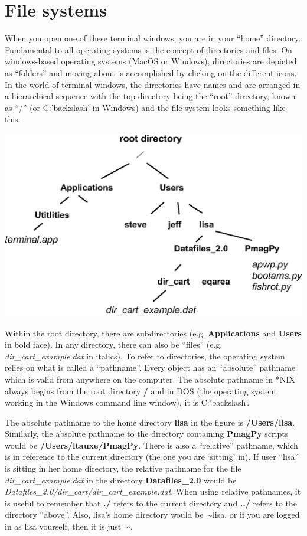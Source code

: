 \documentclass[11pt]{book}
\begin{document}
{  
\section{File systems}
\label{sect:file_systems}
    When you open one of these terminal windows,  you are in your  ``home'' directory.   
Fundamental to all  operating systems is the concept of
directories and files.  On windows-based operating systems (MacOS or Windows), directories are depicted
as ``folders'' and moving about is accomplished by clicking on the different icons.
In the world of terminal windows, the directories have names and are arranged in a hierarchical sequence with
the top directory being the ``root'' directory, known as  ``/'' (or C:'backslash' in Windows) and the file system looks something like this:


  \includegraphics[width=15cm]{EPSfiles/filesys.eps}

 Within the root directory, there are subdirectories
(e.g. {\bf Applications} and {\bf Users} in bold face).  In any directory, there can also be ``files''
(e.g. {\it dir\_cart\_example.dat} in italics).   To
refer to directories,  the operating system relies on what is called a ``pathname''. Every object
has an ``absolute'' pathname which is valid from anywhere on the computer.  The
absolute pathname in *NIX always begins from the root directory {\bf /} and in DOS (the operating system working in the Windows command line window), it is C:'backslash'. 

The absolute pathname to the home directory {\bf lisa} in the figure is {\bf /Users/lisa}.  
Similarly, the absolute pathname to the directory containing {\bf PmagPy}  
scripts  would be  {\bf /Users/ltauxe/PmagPy}.  There is also a ``relative'' pathname,
which is in reference to the  current directory (the one you are `sitting' in).  If user ``lisa'' is sitting in 
her home directory, the relative pathname for the file {\it dir\_cart\_example.dat} in the directory
{\bf Datafiles\_2.0} would be {\it Datafiles\_2.0/dir\_cart/dir\_cart\_example.dat}.  When using relative
pathnames, it is useful to remember that {\bf ./} refers to the current
directory and {\bf ../} refers to the directory  ``above''.     Also, lisa's home directory would be $\sim$lisa, or if you are logged in as lisa yourself, then it is just $\sim$. 

}
\end{document}
